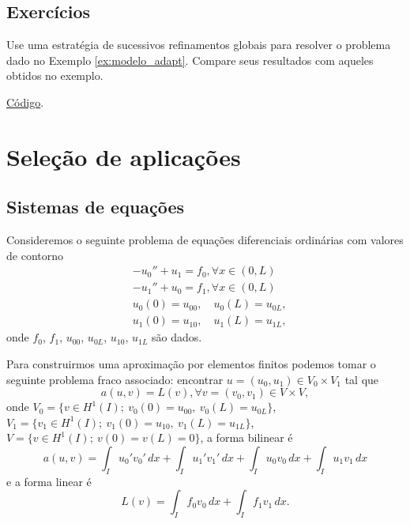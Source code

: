 \subsection*{Exercícios}

\begin{exer}\label{exer:modelo_refglobal}
  Use uma estratégia de sucessivos refinamentos globais para resolver o problema dado no Exemplo \ref{ex:modelo_adapt}. Compare seus resultados com aqueles obtidos no exemplo.
\end{exer}
\begin{resp}
  \ifispython
  \href{https://github.com/phkonzen/notas/blob/master/src/MetodoElementosFinitos/cap_mef1d/dados/exer_dcr/exer_dcr.py}{Código}.
  \fi  
\end{resp}

\section{Seleção de aplicações}\label{cap_mef1d_sec_aps}

\subsection{Sistemas de equações}

Consideremos o seguinte problema de equações diferenciais ordinárias com valores de contorno
\begin{align}
  &-u_0'' + u_1 = f_0,\forall x\in (0, L)\\ 
  &-u_1'' + u_0 = f_1,\forall x\in (0, L)\\
  &u_0(0)=u_{00},\quad u_0(L)=u_{0L},\\
  &u_1(0)=u_{10},\quad u_1(L)=u_{1L},
\end{align}
onde $f_0$, $f_1$, $u_{00}$, $u_{0L}$, $u_{10}$, $u_{1L}$ são dados.

Para construirmos uma aproximação por elementos finitos podemos tomar o seguinte problema fraco associado: encontrar $u = (u_0, u_1)\in V_0\times V_1$ tal que
\begin{equation}
  a(u, v) = L(v), \forall v = (v_0, v_1)\in V\times V,
\end{equation}
onde $V_0 = \{v\in H^1(I);~v_0(0)=u_{00},~v_0(L)=u_{0L}\}$, $V_1=\{v_1\in H^1(I);~v_1(0)=u_{10},~v_1(L)=u_{1L}\}$, $V = \{v\in H^1(I);~v(0)=v(L)=0\}$, a forma bilinear é
\begin{equation}\label{eq:sis_lin_bilinear}
  a(u, v) = \int_{I} u_0'v_0'\,dx + \int_{I} u_1'v_1'\,dx + \int_{I} u_0v_0\,dx + \int_{I} u_1v_1\,dx
\end{equation}
e a forma linear é
\begin{equation}\label{eq:sis_lin_linear}
  L(v) = \int_I f_0v_0\,dx + \int_I f_1v_1\,dx.
\end{equation}

